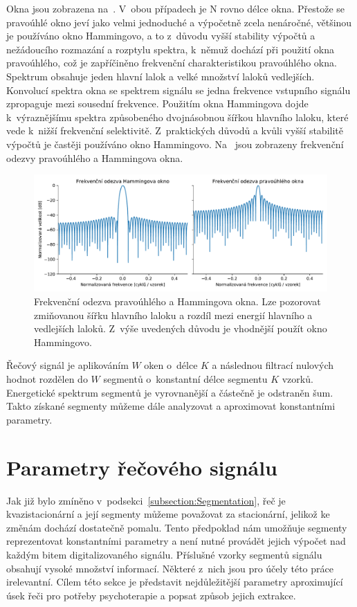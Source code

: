 Okna jsou zobrazena na~. V~obou případech je N rovno délce okna. Přestože se pravoúhlé okno jeví jako velmi jednoduché a výpočetně zcela nenáročné, většinou je používáno okno Hammingovo, a to z~důvodu vyšší stability výpočtů a nežádoucího rozmazání a rozptylu spektra, k~němuž dochází při použití okna pravoúhlého, což je zapříčiněno frekvenční charakteristikou pravoúhlého okna. Spektrum obsahuje jeden hlavní lalok a velké množství laloků vedlejších. Konvolucí spektra okna se spektrem signálu se jedna frekvence vstupního signálu zpropaguje mezi sousední frekvence. Použitím okna Hammingova dojde k~výraznějšímu  spektra způsobeného dvojnásobnou šířkou hlavního laloku, které vede k~nižší frekvenční selektivitě. Z~praktických důvodů a kvůli vyšší stabilitě výpočtů je častěji používáno okno Hammingovo. Na~ jsou zobrazeny frekvenční odezvy pravoúhlého a Hammingova okna.

\begin{figure}[ht]
  \centering
  \includegraphics[width=\linewidth]{obrazky-figures/hamming_rectangular_spektrum.pdf}
  \caption{Frekvenční odezva pravoúhlého a Hammingova okna. Lze pozorovat zmiňovanou šířku hlavního laloku a rozdíl mezi energií hlavního a vedlejších laloků. Z~výše uvedených důvodu je vhodnější použít okno Hammingovo.}
  \label{fig:Hamming_rectangular_spektrum}
\end{figure}

Řečový signál je aplikováním $W$ oken o~délce $K$ a následnou filtrací nulových hodnot rozdělen do $W$ segmentů o~konstantní délce segmentu $K$ vzorků. Energetické spektrum segmentů je vyrovnanější a částečně je odstraněn šum. Takto získané segmenty můžeme dále analyzovat a aproximovat konstantními parametry.  




\section{Parametry řečového signálu}
Jak již bylo zmíněno v~podsekci~\ref{subsection:Segmentation}, řeč je kvazistacionární a její segmenty můžeme považovat za stacionární, jelikož ke změnám dochází dostatečně pomalu. Tento předpoklad nám umožňuje segmenty reprezentovat konstantními parametry a není nutné provádět jejich  výpočet nad každým bitem digitalizovaného signálu. Příslušné vzorky segmentů signálu obsahují vysoké množství informací. Některé z~nich jsou pro účely této práce irelevantní. Cílem této sekce je představit nejdůležitější parametry aproximující úsek řeči pro potřeby psychoterapie a popsat způsob jejich extrakce. 

